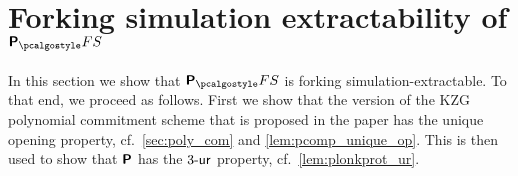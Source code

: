\documentclass[runningheads,10pt]{llncs}
\begin{document}


\section{Forking simulation extractability of $\plonkprotfs$} 
\label{sec:plonk}
In this section we show that $\plonkprotfs$ is forking simulation-extractable. To that
end, we proceed as follows. First we show that the version of the KZG polynomial
commitment scheme that is proposed in the \plonk{} paper has the unique opening
property, cf.~\cref{sec:poly_com} and \cref{lem:pcomp_unique_op}. This is then
used to show that $\bm{\mathsf{P}}$ has the ${3\text{-}\mathsf{ur}}$ property,
cf.~\cref{lem:plonkprot_ur}.
\end{document}
